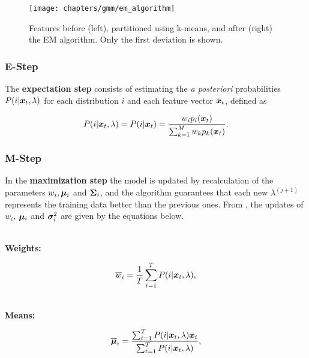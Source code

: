 \begin{figure}[ht]
    \centering
    \texttt{[image: chapters/gmm/em\_algorithm]}
    \caption{Features before (left), partitioned using k-means, and after (right) the EM algorithm. Only the first deviation is shown.}
    \label{fig:em_algorithm}
\end{figure}

\subsubsection*{E-Step}

The \textbf{expectation step} consists of estimating the \emph{a posteriori} probabilities $P(i|\boldsymbol{x}_t, \lambda)$ for each distribution $i$ and each feature vector $\boldsymbol{x}_t$, defined as

\begin{equation}
    \postprob{i}{\dvec{x}_t, \lambda} = \postprob{i}{\dvec{x}_t} = \frac{w_i p_i(\dvec{x}_t)}{\sum_{k=1}^M w_k p_k(\dvec{x}_t)}.
    \label{eq:e-step-posterior}
\end{equation}

\subsubsection*{M-Step}

In the \textbf{maximization step} the model is updated by recalculation of the parameters $w_i, \boldsymbol{\mu}_i$ and $\boldsymbol{\Sigma}_i$, and the algorithm guarantees that each new $\lambda^{(j+1)}$ represents the training data better than the previous ones. From , the updates of $w_i$, $\boldsymbol{\mu}_i$ and $\boldsymbol{\sigma}_i^2$ are given by the equations below.

\noindent\\\textbf{Weights:}

\begin{equation}
    \overline{w}_i = \frac{1}{T} \sum_{t=1}^T \postprob{i}{\dvec{x}_t, \lambda},
    \label{eq:m-step-weight}
\end{equation}

\noindent\\\textbf{Means:}

\begin{equation}
    \overline{\dvec{\mu}}_i = \frac{\sum_{t=1}^T \postprob{i}{\dvec{x}_t, \lambda} \dvec{x}_t}{\sum_{t=1}^T \postprob{i}{\dvec{x}_t, \lambda}},
    \label{eq:m-step-means}
\end{equation}

